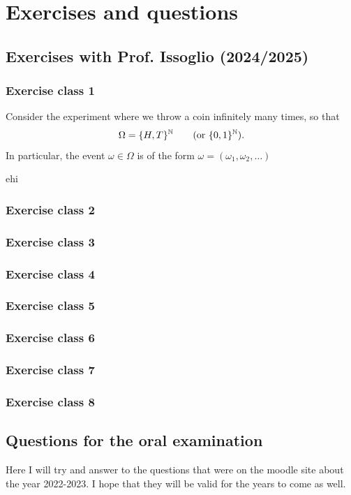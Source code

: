 \documentclass{report}
\begin{document}
\chapter{Exercises and questions}
\section{Exercises with Prof. Issoglio (2024/2025)}
\subsection{Exercise class 1}
\begin{exercise}
	Consider the experiment where we throw a coin infinitely many times, so that 
	\begin{equation*}
		\Omega=\{H,T\}^{\mathbb{N}} \qquad\text{(or $\{0,1\}^{\mathbb{N}}$)}.
	\end{equation*}
	In particular, the event $\omega\in\Omega$ is of the form $\omega=(\omega_1,\omega_2,\ldots)$
\end{exercise}
\begin{exercise}
	ehi
\end{exercise}
\subsection{Exercise class 2}
\subsection{Exercise class 3}
\subsection{Exercise class 4}
\subsection{Exercise class 5}
\subsection{Exercise class 6}
\subsection{Exercise class 7}
\subsection{Exercise class 8}
\section{Questions for the oral examination}
Here I will try and answer to the questions that were on the moodle site about the year 2022-2023. I hope that they will be valid for the years to come as well.
\end{document}
